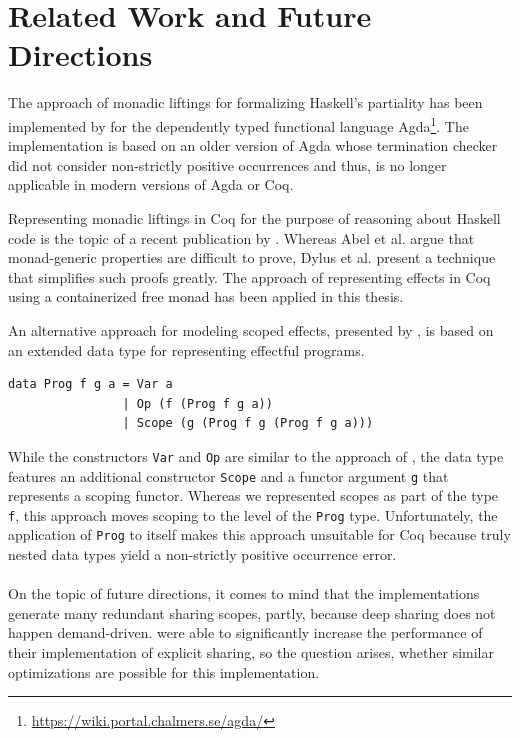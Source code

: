 \documentclass[a4paper, 11pt, fleqn, twoside]{scrreprt}
\newcommand{\hinl}[1]{\texttt{#1}}
\newcommand{\cinl}[1]{\texttt{#1}}
\begin{document}
\section{Related Work and Future Directions}

The approach of monadic liftings for formalizing Haskell's partiality has been implemented by \citet{abel2005verifying} for the dependently typed functional language Agda\footnote{\url{https://wiki.portal.chalmers.se/agda/}}.
The implementation is based on an older version of Agda whose termination checker did not consider non-strictly positive occurrences and thus, is no longer applicable in modern versions of Agda or Coq.

Representing monadic liftings in Coq for the purpose of reasoning about Haskell code is the topic of a recent publication by \citet{dylus2019oneMonad}.
Whereas Abel et al. argue that monad-generic properties are difficult to prove, Dylus et al. present a technique that simplifies such proofs greatly.
The approach of representing effects in Coq using a containerized free monad has been applied in this thesis.

An alternative approach for modeling scoped effects, presented by \citet{pirog2018syntax}, is based on an extended data type for representing effectful programs.

\begin{verbatim}
data Prog f g a = Var a
                | Op (f (Prog f g a))
                | Scope (g (Prog f g (Prog f g a)))
\end{verbatim}

While the constructors \hinl{Var} and \hinl{Op} are similar to the approach of \citet{wu2014effect}, the data type features an additional constructor \hinl{Scope} and a functor argument \hinl{g} that represents a scoping functor.
Whereas we represented scopes as part of the type \cinl{f}, this approach moves scoping to the level of the \hinl{Prog} type.
Unfortunately, the application of \hinl{Prog} to itself makes this approach unsuitable for Coq because truly nested data types yield a non-strictly positive occurrence error.

\paragraph{}

On the topic of future directions, it comes to mind that the implementations generate many redundant sharing scopes, partly, because deep sharing does not happen demand-driven.
\citet{fischer2009purely} were able to significantly increase the performance of their implementation of explicit sharing, so the question arises, whether similar optimizations are possible for this implementation.
\end{document}
